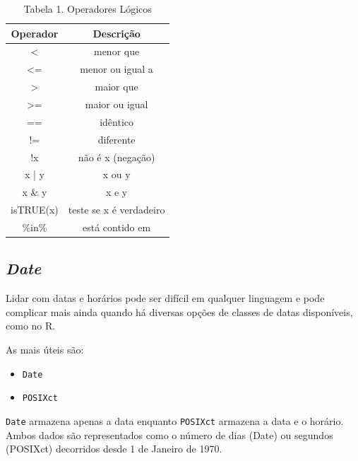 \documentclass[]{book}
\begin{document}
\begin{table}

\caption{\label{tab:chunck14}Tabela 1. Operadores Lógicos}
\centering
\begin{tabular}[t]{c|c}
\hline
Operador & Descrição\\
\hline
< & menor que\\
\hline
<= & menor ou igual a\\
\hline
> & maior que\\
\hline
>= & maior ou igual\\
\hline
== & idêntico\\
\hline
!= & diferente\\
\hline
!x & não é x (negação)\\
\hline
x | y & x ou y\\
\hline
x \& y & x e y\\
\hline
isTRUE(x) & teste se x é verdadeiro\\
\hline
\%in\% & está contido em\\
\hline
\end{tabular}
\end{table}

\subsection{\texorpdfstring{\emph{Date}}{Date}}\label{date}

Lidar com datas e horários pode ser difícil em qualquer linguagem e pode
complicar mais ainda quando há diversas opções de classes de datas
disponíveis, como no R.

As mais úteis são:

\begin{itemize}
\item
  \texttt{Date}
\item
  \texttt{POSIXct}
\end{itemize}

\texttt{Date} armazena apenas a data enquanto \texttt{POSIXct} armazena
a data e o horário. Ambos dados são representados como o número de dias
(Date) ou segundos (POSIXct) decorridos desde 1 de Janeiro de 1970.
\end{document}
